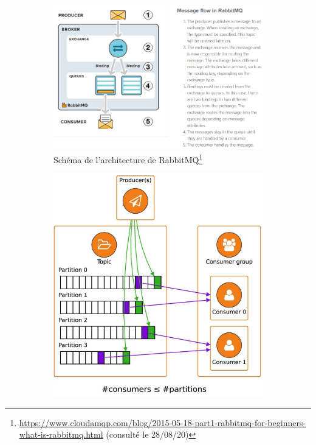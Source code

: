 \documentclass[11pt]{article}
\begin{document}
			\medskip
			\begin{figure}[hp]
				\begin{subfigure}{0.6\textwidth}
					\hspace*{-2cm}
					\includegraphics[scale=0.5]{../include/RabbitMQ.PNG}
					\caption{Schéma de l'architecture de RabbitMQ\footnote{\href{https://www.cloudamqp.com/blog/2015-05-18-part1-rabbitmq-for-beginners-what-is-rabbitmq.html}{https://www.cloudamqp.com/blog/2015-05-18-part1-rabbitmq-for-beginners-what-is-rabbitmq.html} (consulté le 28/08/20)}}
					\label{fig:archirabbitmq}
				\end{subfigure}
				\begin{subfigure}{0.5\textwidth}
					\includegraphics[scale=0.55]{../include/Kafka.PNG}

\end{subfigure}
\end{figure}
\end{document}
